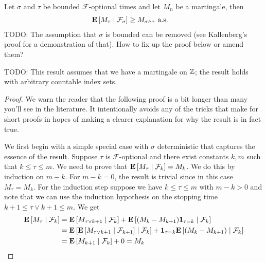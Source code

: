 \begin{thm}\label{OptionalSamplingDiscrete}Let $\sigma$ and $\tau$ be bounded
  $\mathcal{F}$-optional times and
  let $M_n$ be a martingale, then 
\begin{align*}
\cexpectationlong{\mathcal{F}_\sigma}{M_\tau} &\geq M_{\sigma \wedge
  \tau}
\text{ a.s.}
\end{align*}
TODO: The assumption that $\sigma$ is bounded can be removed (see
Kallenberg's proof for a demonstration of that).  How to fix up the
proof below or amend them?

TODO: This result assumes that we have a martingale on $\integers$;
the result holds with arbitrary countable index sets.
\end{thm}
\begin{proof}
We warn the reader that the following proof is a bit longer than many
you'll see in the literature.  It intentionally avoids any of the
tricks that make for short proofs in hopes of making a clearer
explanation for why the result is in fact true.

We first begin with a simple special case with $\sigma$ deterministic that captures the essence of
the result.  Suppose $\tau$ is $\mathcal{F}$-optional and there exist
constants $k, m$ such that $k \leq \tau \leq m$.  We need to prove
that $\cexpectationlong{\mathcal{F}_k}{M_\tau} = M_k$.  We do this by
induction on $m-k$.  For $m-k=0$, the result is trivial since in this
case $M_\tau = M_k$.  For the induction step suppose we have $k \leq
\tau \leq m$ with $m-k >0$ and note that we can use the induction
hypothesis on the stopping time $k+1 \leq \tau\vee k+1 \leq m$.  We
get
\begin{align*}
\cexpectationlong{\mathcal{F}_k}{M_\tau} &=
\cexpectationlong{\mathcal{F}_k}{M_{\tau \vee k+1}} +
\cexpectationlong{\mathcal{F}_k}{(M_k-M_{k+1})\characteristic{\tau=k}}
\\
&=\cexpectationlong{\mathcal{F}_k}{\cexpectationlong{\mathcal{F}_{k+1}}{M_{\tau
      \vee k+1}} } +
\characteristic{\tau=k}\cexpectationlong{\mathcal{F}_k}{(M_k-M_{k+1})}
\\
&=\cexpectationlong{\mathcal{F}_k}{M_{k+1}} + 0 = M_k
\end{align*}


\end{proof}
